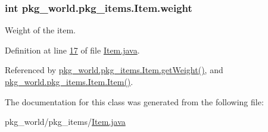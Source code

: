 \hypertarget{classpkg__world_1_1pkg__items_1_1Item_a3550e4e4d450da85707ad86b33e88667}{
\subsubsection[{weight}]{\setlength{\rightskip}{0pt plus 5cm}int pkg\-\_\-world.\-pkg\-\_\-items.\-Item.\-weight\hspace{0.3cm}{\ttfamily [private]}}}\label{classpkg__world_1_1pkg__items_1_1Item_a3550e4e4d450da85707ad86b33e88667}


Weight of the item. 



Definition at line \hyperlink{Item_8java_source_l00017}{17} of file \hyperlink{Item_8java_source}{Item.\-java}.



Referenced by \hyperlink{Item_8java_source_l00048}{pkg\-\_\-world.\-pkg\-\_\-items.\-Item.\-get\-Weight()}, and \hyperlink{Item_8java_source_l00030}{pkg\-\_\-world.\-pkg\-\_\-items.\-Item.\-Item()}.



The documentation for this class was generated from the following file\-:\begin{DoxyCompactItemize}
\item 
pkg\-\_\-world/pkg\-\_\-items/\hyperlink{Item_8java}{Item.\-java}\end{DoxyCompactItemize}
